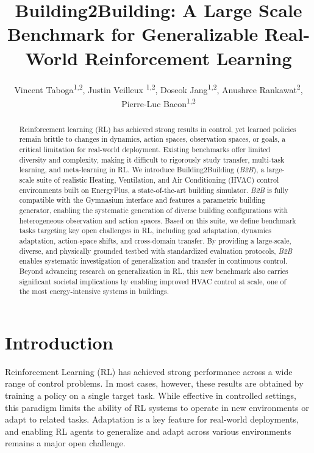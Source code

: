 \documentclass[10pt]{article} %
\title{Building2Building: A Large Scale Benchmark for Generalizable Real-World Reinforcement Learning}
\author{Vincent Taboga\textsuperscript{1,2}, Justin Veilleux \textsuperscript{1,2}, Doseok Jang\textsuperscript{1,2}, Anushree Rankawat\textsuperscript{2}, Pierre-Luc Bacon\textsuperscript{1,2}}
\newcommand{\btob}{{\textit{B2B}}}
\newcommand{\buildingtobuilding}{{Building2Building}}
\begin{document}
\makeCover  %
\maketitle

\begin{abstract}
Reinforcement learning (RL) has achieved strong results in control, yet learned policies remain brittle to changes in dynamics, action spaces, observation spaces, or goals, a critical limitation for real-world deployment. Existing benchmarks offer limited diversity and complexity, making it difficult to rigorously study transfer, multi-task learning, and meta-learning in RL. We introduce \buildingtobuilding{} (\btob{}), a large-scale suite of realistic Heating, Ventilation, and Air Conditioning (HVAC) control environments built on EnergyPlus, a state-of-the-art building simulator. \btob{} is fully compatible with the Gymnasium interface and features a parametric building generator, enabling the systematic generation of diverse building configurations with heterogeneous observation and action spaces. Based on this suite, we define benchmark tasks targeting key open challenges in RL, including goal adaptation, dynamics adaptation, action-space shifts, and cross-domain transfer. By providing a large-scale, diverse, and physically grounded testbed with standardized evaluation protocols, \btob{} enables systematic investigation of generalization and transfer in continuous control. Beyond advancing research on generalization in RL, this new benchmark also carries significant societal implications by enabling improved HVAC control at scale, one of the most energy-intensive systems in buildings.
\end{abstract}

\section{Introduction}

Reinforcement Learning (RL) has achieved strong performance across a wide range of control problems. In most cases, however, these results are obtained by training a policy on a single target task. While effective in controlled settings, this paradigm limits the ability of RL systems to operate in new environments or adapt to related tasks. Adaptation is a key feature for real-world deployments, and enabling RL agents to generalize and adapt across various environments remains a major open challenge.
\end{document}
